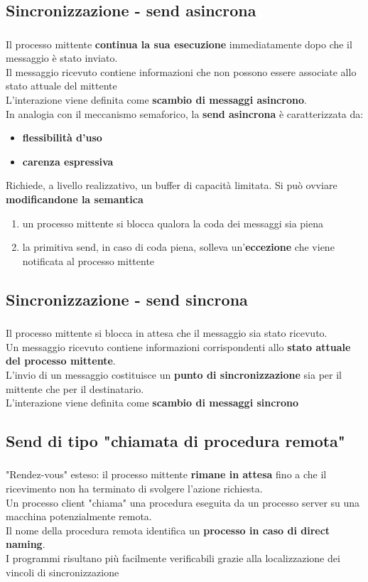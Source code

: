 \documentclass{beamer}
\newenvironment{mainframe}{
	\begin{frame}
		\frametitle{\insertsubsection}
		\framesubtitle{\insertsection}
	}{
	\end{frame}
}
\begin{document}
\subsection{Sincronizzazione - send asincrona}
\begin{mainframe}
	Il processo mittente \textbf{continua la sua esecuzione} immediatamente dopo che il messaggio è stato inviato.\\
	Il messaggio ricevuto contiene informazioni che non possono essere associate allo stato attuale del mittente\\
	L'interazione viene definita come \textbf{scambio di messaggi asincrono}.\\
	In analogia con il meccanismo semaforico, la \textbf{send asincrona} è caratterizzata da:
	\begin{itemize}
		\item \textbf{flessibilità d'uso}
		\item \textbf{carenza espressiva}
	\end{itemize}
	Richiede, a livello realizzativo, un buffer di capacità limitata. Si può ovviare \textbf{modificandone la semantica}
	\begin{enumerate}
		\item un processo mittente si blocca qualora la coda dei messaggi sia piena
		\item la primitiva send, in caso di coda piena, solleva un'\textbf{eccezione} che viene notificata al processo mittente
	\end{enumerate}
\end{mainframe}
\subsection{Sincronizzazione - send sincrona}
\begin{mainframe}
	Il processo mittente si blocca in attesa che il messaggio sia stato ricevuto.\\
	Un messaggio ricevuto contiene informazioni corrispondenti allo \textbf{stato attuale del processo mittente}.\\
	L'invio di un messaggio costituisce un \textbf{punto di sincronizzazione} sia per il mittente che per il destinatario.\\
	L'interazione viene definita come \textbf{scambio di messaggi sincrono}
\end{mainframe}
\subsection{Send di tipo "chiamata di procedura remota"}
\begin{mainframe}
	"Rendez-vous" esteso: il processo mittente \textbf{rimane in attesa} fino a che il ricevimento non ha terminato di svolgere l'azione richiesta.\\
	Un processo client "chiama" una procedura eseguita da un processo server su una macchina potenzialmente remota.\\
	Il nome della procedura remota identifica un \textbf{processo in caso di direct naming}.\\
	I programmi risultano più facilmente verificabili grazie alla localizzazione dei vincoli di sincronizzazione
\end{mainframe}
\end{document}
